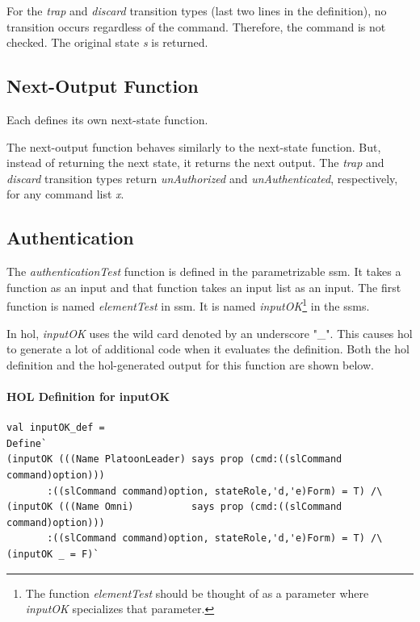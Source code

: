 \documentclass[../../main/main.tex]{subfiles}
\begin{document}
For the \textit{trap} and \textit{discard} transition types (last two lines in the definition), no transition occurs regardless of the command.  Therefore, the command is not checked.  The original state \textit{s} is returned.



\subsection{Next-Output Function}
Each  defines its own next-state function. 

\HOLssmPBIntegratedTheoremsPBOutXXdef

The next-output function behaves similarly to the next-state function.  But, instead of returning the next state, it returns the next output.  The \textit{trap} and \textit{discard} transition types return \textit{unAuthorized} and \textit{unAuthenticated}, respectively, for any command list \textit{x}.

\subsection{Authentication}
The \textit{authenticationTest} function is defined in the parametrizable ssm.  It takes a function as an input and that function takes an input list as an input.  The first function is named \textit{elementTest} in ssm.  It is named \textit{inputOK}\footnote{The function \textit{elementTest} should be thought of as a parameter where \textit{inputOK} specializes that parameter.} in the \glspl{ssm}.

In \gls{hol}, \textit{inputOK} uses the wild card denoted by an underscore "_".  This causes \gls{hol} to generate a lot of additional code when it evaluates the definition.  Both the \gls{hol} definition and the \gls{hol}-generated output for this function are shown below. 


\paragraph*{HOL Definition for inputOK}


\begin{lstlisting}
val inputOK_def =
Define`
(inputOK (((Name PlatoonLeader) says prop (cmd:((slCommand command)option)))
	   :((slCommand command)option, stateRole,'d,'e)Form) = T) /\
(inputOK (((Name Omni)          says prop (cmd:((slCommand command)option)))
	   :((slCommand command)option, stateRole,'d,'e)Form) = T) /\
(inputOK _ = F)`
\end{lstlisting}
\end{document}
